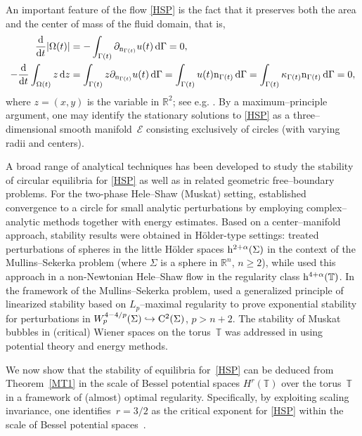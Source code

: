 \documentclass[reqno,11pt]{amsart}
\numberwithin{equation}{section}
\newcommand{\R}{\mathbb{R}}
\newcommand{\G}{\Gamma}
\newcommand{\bT}{\mathbb{T}}
\theoremstyle{remark}
\begin{document}
An important feature of the  flow \eqref{HSP} is the fact that it preserves both the area and the center of mass of the fluid domain, that is,
\begin{align}
\frac{{\rm d}}{{\rm d} t}|\Omega(t)| &= -\int_{\Gamma(t)} \partial_{{\rm n}_{\G(t)}} u(t)\,  {\rm d}\Gamma = 0, \label{lol1}\\
-\frac{{\rm d}}{{\rm d} t}\int_{\Omega(t)} z\,{\rm d}z &=\int_{\Gamma(t)} z\partial_{{\rm n}_{\G(t)}} u(t)\, {\rm d}\Gamma= \int_{\Gamma(t)} u(t){\rm n}_{\G(t)}\, {\rm d}\Gamma 
=\int_{\Gamma(t)} \kappa_{\Gamma(t)} {\rm n}_{\G(t)}\, {\rm d}\Gamma = 0,\label{lol2}
\end{align}
where $z=(x,y)$ is the variable in $\R^2$; see e.g. \cite{NT98, MW2025x}.
By a maximum–principle argument, one may identify the stationary solutions to \eqref{HSP} 
as a three–dimensional smooth manifold~$\mathcal{E}$ consisting exclusively of circles (with varying radii and centers).\medskip

A broad range of analytical techniques has been developed to study the stability of circular equilibria for \eqref{HSP} as well as in related geometric free–boundary problems. 
For the two-phase Hele–Shaw (Muskat) setting, \cite{CP93} established convergence to a circle for small analytic perturbations by employing complex–analytic methods together with energy estimates.
 Based on a center–manifold approach, stability results were obtained in Hölder-type settings: 
\cite{ES98}  treated perturbations of spheres in the little Hölder spaces ${\rm h}^{2+\alpha}(\Sigma)$ in the context of the Mullins–Sekerka problem (where $\Sigma$ is a sphere in $\mathbb{R}^n$, $n\geq 2$), 
while \cite{EMM10} used this approach in a non-Newtonian Hele–Shaw flow in the regularity class ${\rm h}^{4+\alpha}(\mathbb{T})$.
In the framework of the Mullins–Sekerka problem, \cite{PSZ9a, PS16} used  a generalized principle of linearized stability based on $L_p$–maximal regularity to prove
exponential stability for perturbations in $W^{4-4/p}_p(\Sigma)\hookrightarrow {\rm C}^2(\Sigma)$, $p>n+2$.
The stability of Muskat bubbles in (critical) Wiener spaces on the torus~$\mathbb{T}$ was addressed in \cite{GGPS25,GGPS23} using potential theory and energy methods.

We now show that the stability of equilibria for~\eqref{HSP} can be deduced from Theorem~\ref{MT1} in the scale of Bessel potential spaces $H^{r}(\mathbb{\bT})$ over the torus~$\bT$ 
in a framework of (almost) optimal regularity. 
Specifically, by exploiting scaling invariance, one identifies~$r = 3/2$ as the critical exponent for \eqref{HSP} within the scale of Bessel  potential spaces~\cite{MW2025x}.\medskip
\end{document}
